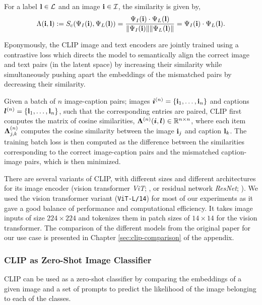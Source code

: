 For a label \(\mathbf{l} \in \mathcal{L}\) and an image \(\mathbf{i} \in \mathcal{I}\), the similarity is given by,
\begin{equation}
    \label{eq:clip-similarity}
    \Lambda(\mathbf{i}, \mathbf{l}) := S_c(\Psi_I(\mathbf{i}), \Psi_L(\mathbf{l})) = \dfrac{\Psi_I(\mathbf{i}) \cdot \Psi_L(\mathbf{l})}{\| \Psi_I(\mathbf{i}) \| \| \Psi_L(\mathbf{l}) \|} = \Psi_I(\mathbf{i}) \cdot \Psi_L(\mathbf{l}).
\end{equation}

Eponymously, the CLIP image and text encoders are jointly trained using a contrastive loss which directs the model to semantically align the correct image and text pairs (in the latent space) by increasing their similarity while simultaneously pushing apart the embeddings of the mismatched pairs by decreasing their similarity.

Given a batch of \(n\) image-caption pairs; images \(\bm{i}^{(n)} = \{ \mathbf{i}_1, \dots, \mathbf{i}_{n} \}\) and captions \(\bm{l}^{(n)} = \{ \mathbf{l}_1, \dots, \mathbf{l}_{n} \}\), such that the corresponding entries are paired, CLIP first computes the matrix of cosine similarities, \(\bm{\Lambda}^{(n)}(\bm{i}, \bm{l}) \in \mathbb{R}^{n \times n}\), where each item \(\bm{\Lambda}^{(n)}_{j,k}\) computes the cosine similarity between the image \(\mathbf{i}_j\) and caption \(\mathbf{l}_k\).
The training batch loss is then computed as the difference between the similarities corresponding to the correct image-caption pairs and the mismatched caption-image pairs, which is then minimized.

There are several variants of CLIP, with different sizes and different architectures for its image encoder (vision transformer \emph{ViT}; \cite{vit}, or residual network \emph{ResNet}; \cite{resnet}).
We used the vision transformer variant (\texttt{ViT-L/14}) for most of our experiments as it gave a good balance of performance and computational efficiency.
It takes image inputs of size \(224 \times 224\) and tokenizes them in patch sizes of \(14 \times 14\) for the vision transformer.
The comparison of the different models from the original paper for our use case is presented in Chapter \ref{sec:clip-comparison} of the appendix.

\subsubsection{CLIP as Zero-Shot Image Classifier}
\label{sec:clip-classifier}
CLIP can be used as a zero-shot classifier by comparing the embeddings of a given image and a set of prompts to predict the likelihood of the image belonging to each of the classes.

